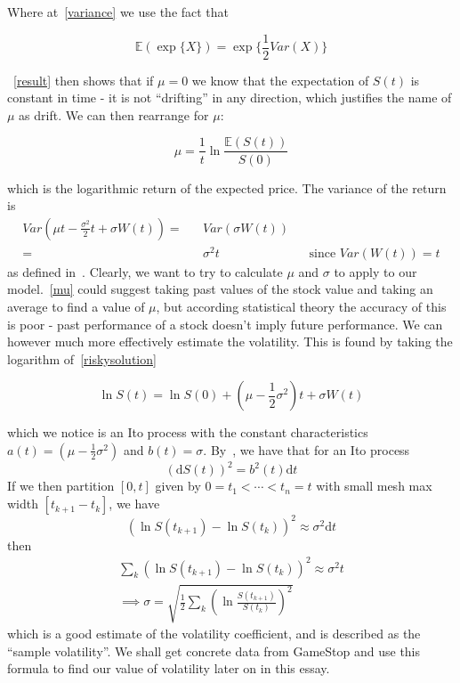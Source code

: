 \documentclass[11pt]{article} %
\begin{document}
Where at~\eqref{variance} we use the fact that 

\begin{equation*}
    \mathbb{E}(\exp\{X\}) = \exp\{\frac{1}{2}Var(X)\}
\end{equation*}

~\eqref{result} then shows that if $\mu = 0$ we know that the expectation of $S(t)$ is 
constant in time - it is not ``drifting'' in any direction, which justifies the 
name of $\mu$ as drift. We can then rearrange for $\mu$:

\begin{equation} \label{mu}
    \mu = \frac{1}{t}\ln{\frac{\mathbb{E}(S(t))}{S(0)}}
\end{equation}

which is the logarithmic return of the expected price.
The variance of the return is 
\begin{align}
    Var(\mu t - \frac{\sigma^2}{2}t + \sigma W(t)) = && Var(\sigma W(t)) \\
    = && \sigma^2t  && \text{since $Var(W(t)) = t$}
\end{align}
as defined in~\cite{blackscholes}. Clearly, we want to try to calculate $\mu$ and 
$\sigma$ to apply to our model.~\eqref{mu} could suggest taking past values of the 
stock value and taking an average to find a value of $\mu$, but according statistical 
theory the accuracy of this is poor - past performance of a stock doesn't imply future 
performance.
We can however much more effectively estimate the volatility. This is found by taking 
the logarithm 
of~\eqref{riskysolution}

\[
    \ln{S(t)} = \ln{S(0)} + (\mu - \frac{1}{2}\sigma^2)t + \sigma W(t)
\]

which we notice is an Ito process with the constant characteristics 
$a(t) = (\mu - \frac{1}{2}\sigma^2)$
 and $b(t) = \sigma$. By~\cite{quadtraticvariation}, we have that for an Ito process
 \begin{equation}
     {(\mathrm{d}S(t))}^2 = b^2(t) \mathrm{d}t
 \end{equation}
 If we then partition $[0,t]$ given by $0 = t_1 < \cdots < t_n = t$ with small mesh max 
 width $[t_{k+1} - t_k]$, we have 
 \begin{equation}
     {(\ln{S(t_{k+1}) - \ln{S(t_k)}})}^2 \approx \sigma^2 \mathrm{d}t
 \end{equation}
then 
\begin{align}
    \sum_k {(\ln{S(t_{k+1}) - \ln{S(t_k)}})}^2 \approx \sigma^2 t\\
    \implies
    \sigma = \sqrt{\frac{1}{2}\sum_k {(\ln{\frac{S(t_{k+1})}{S(t_k)}})}^2}
    \label{volatilityapprox}
\end{align}
which is a good estimate of the volatility coefficient, and is described as the 
``sample volatility''. We shall get concrete data from GameStop and use this formula 
to find our value of volatility later on in this essay.
\end{document}
